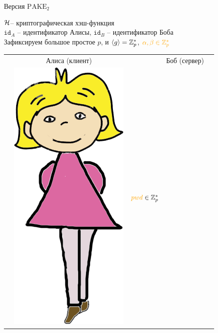 \documentclass[usenames,dvipsnames,8pt,aspectratio=169]{beamer}
\begin{document}
\begin{frame}{ Версия $\text{PAKE}_2$}
\Large
\vspace{-20pt}
\begin{center}
	$\mathcal{H}$-- криптографическая хэш-функция  \\[3pt]
	$\mathtt{id}_{A}$ -- идентификатор Алисы, $\mathtt{id}_{B}$ -- идентификатор Боба\\[3pt]
	Зафиксируем большое простое $p$, и $\langle g \rangle = {{\mathbb Z}}_p^\ast$, $\color{Orange} \alpha, \beta \in \Zp^\ast $\\
	\large 
	\begin{center}
		\begin{tabular}{l c c c l}
			& Алиса (клиент)  & & Боб (сервер) &  \\
			& \multirow{2}{*}{\includegraphics[scale=0.15]{Alice}} & { ${\color{Orange}pwd} \in \Zp^\ast $} &  \hspace{-20pt}

\end{tabular}
\end{center}
\end{center}
\end{frame}
\end{document}
